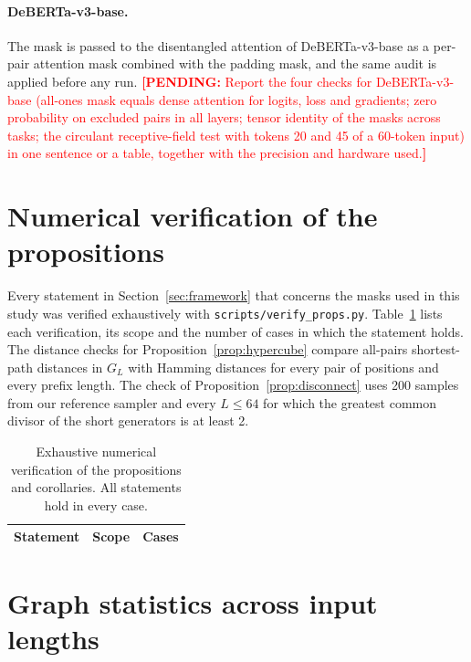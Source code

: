 \documentclass[10pt]{article}
\newcommand{\pending}[1]{\textcolor{red}{\textbf{[PENDING:} #1\textbf{]}}}
\begin{document}
\paragraph{DeBERTa-v3-base.} The mask is passed to the disentangled attention of DeBERTa-v3-base as a per-pair attention mask combined with the padding mask, and the same audit is applied before any run. \pending{Report the four checks for DeBERTa-v3-base (all-ones mask equals dense attention for logits, loss and gradients; zero probability on excluded pairs in all layers; tensor identity of the masks across tasks; the circulant receptive-field test with tokens 20 and 45 of a 60-token input) in one sentence or a table, together with the precision and hardware used.}

\section{Numerical verification of the propositions}
\label{app:verify}

Every statement in Section~\ref{sec:framework} that concerns the masks used in this study was verified exhaustively with \texttt{scripts/verify\_props.py}. Table~\ref{tab:verify} lists each verification, its scope and the number of cases in which the statement holds. The distance checks for Proposition~\ref{prop:hypercube} compare all-pairs shortest-path distances in $G_L$ with Hamming distances for every pair of positions and every prefix length. The check of Proposition~\ref{prop:disconnect} uses 200 samples from our reference sampler and every $L\le64$ for which the greatest common divisor of the short generators is at least 2.

\begin{table}[H]
\centering
\caption{Exhaustive numerical verification of the propositions and corollaries. All statements hold in every case.}
\label{tab:verify}
\scriptsize
\begin{tabular}{llr}
\toprule
Statement & Scope & Cases \\
\midrule

\end{tabular}
\end{table}

\section{Graph statistics across input lengths}
\label{app:graphL}
\end{document}
